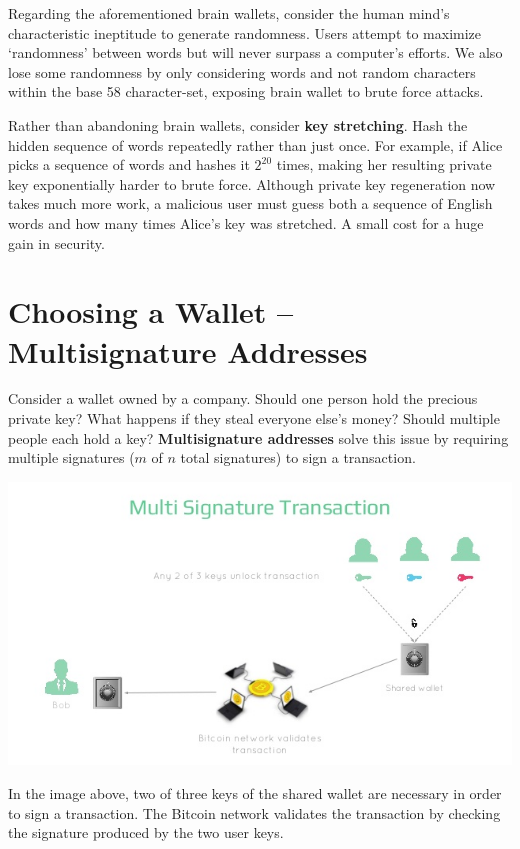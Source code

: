 \documentclass[full.tex]{subfiles}
\begin{document}
    Regarding the aforementioned brain wallets, consider the human mind's characteristic ineptitude to generate randomness. Users attempt to maximize `randomness' between words but will never surpass a computer's efforts. We also lose some randomness by only considering words and not random characters within the base 58 character-set, exposing brain wallet to brute force attacks.
    
    Rather than abandoning brain wallets, consider \textbf{key stretching}. Hash the hidden sequence of words repeatedly rather than just once. For example, if Alice picks a sequence of words and hashes it $2^{20}$ times, making her resulting private key exponentially harder to brute force. Although private key regeneration now takes much more work, a malicious user must guess both a sequence of English words and how many times Alice's key was stretched. A small cost for a huge gain in security.
    
    \section*{Choosing a Wallet -- Multisignature Addresses}
    
    Consider a wallet owned by a company. Should one person hold the precious private key? What happens if they steal everyone else's money? Should multiple people each hold a key? \textbf{Multisignature addresses} solve this issue by requiring multiple signatures ($m$ of $n$ total signatures) to sign a transaction.
    
   \includegraphics[scale=0.6]{multisig}

    In the image above, two of three keys of the shared wallet are necessary in order to sign a transaction. The Bitcoin network validates the transaction by checking the signature produced by the two user keys.
    
\end{document}
